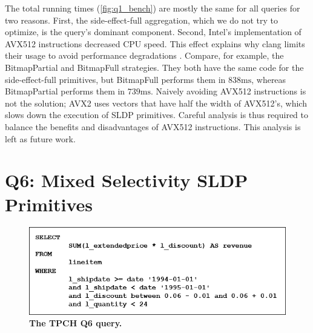\documentclass[12pt]{cmuthesis}
\begin{document}
The total running times (\cref{fig:q1_bench}) are mostly the same for all queries for two reasons. First, the side-effect-full aggregation, which we do not try to optimize, is the query's dominant component. Second, Intel's implementation of AVX512 instructions decreased CPU speed. This effect explains why clang limits their usage to avoid performance degradations \cite{avx512_registers}. Compare, for example, the BitmapPartial and BitmapFull strategies. They both have the same code for the side-effect-full primitives, but BitmapFull performs them in $838\text{ms}$, whereas BitmapPartial performs them in $739\text{ms}$. Naively avoiding AVX512 instructions is not the solution; AVX2 uses vectors that have half the width of AVX512's, which slows down the execution of SLDP primitives. Careful analysis is thus required to balance the benefits and disadvantages of AVX512 instructions. This analysis is left as future work.


\section{Q6: Mixed Selectivity SLDP Primitives}
\label{q6section}
\begin{figure}[t!]
    \centering
    \includegraphics[scale=0.5]{images/TPCH-Q6.png}
    \caption{\textbf{The TPCH Q6 query.}}
    \label{fig:tpch_q6}
\end{figure}
 
\end{document}

